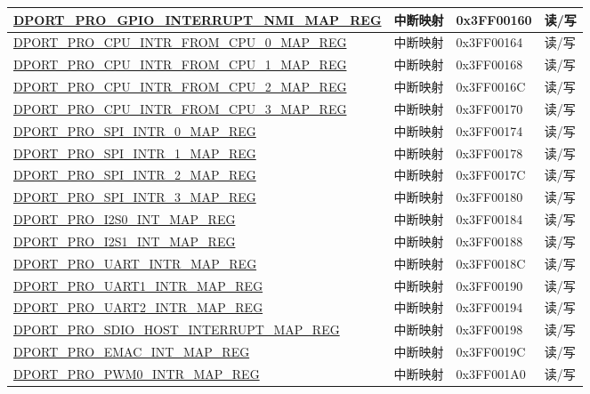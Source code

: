 \begin{longtable}{|L{8.2cm}|L{4.5cm}| l | l | }
\hyperref[regdesc:PROGPIOINTERRUPTNMIMAPREG]{DPORT\_PRO\_GPIO\_INTERRUPT\_NMI\_MAP\_REG} & 中断映射 & 0x3FF00160 & 读/写 \\ \hline
\hyperref[regdesc:PROCPUINTRFROMCPU0MAPREG]{DPORT\_PRO\_CPU\_INTR\_FROM\_CPU\_0\_MAP\_REG} & 中断映射 & 0x3FF00164 & 读/写 \\ \hline
\hyperref[regdesc:PROCPUINTRFROMCPU1MAPREG]{DPORT\_PRO\_CPU\_INTR\_FROM\_CPU\_1\_MAP\_REG} & 中断映射 & 0x3FF00168 & 读/写 \\ \hline
\hyperref[regdesc:PROCPUINTRFROMCPU2MAPREG]{DPORT\_PRO\_CPU\_INTR\_FROM\_CPU\_2\_MAP\_REG} & 中断映射 & 0x3FF0016C & 读/写 \\ \hline
\hyperref[regdesc:PROCPUINTRFROMCPU3MAPREG]{DPORT\_PRO\_CPU\_INTR\_FROM\_CPU\_3\_MAP\_REG} & 中断映射 & 0x3FF00170 & 读/写 \\ \hline
\hyperref[regdesc:PROSPIINTR0MAPREG]{DPORT\_PRO\_SPI\_INTR\_0\_MAP\_REG} & 中断映射 & 0x3FF00174 & 读/写 \\ \hline
\hyperref[regdesc:PROSPIINTR1MAPREG]{DPORT\_PRO\_SPI\_INTR\_1\_MAP\_REG} & 中断映射 & 0x3FF00178 & 读/写 \\ \hline
\hyperref[regdesc:PROSPIINTR2MAPREG]{DPORT\_PRO\_SPI\_INTR\_2\_MAP\_REG} & 中断映射 & 0x3FF0017C & 读/写 \\ \hline
\hyperref[regdesc:PROSPIINTR3MAPREG]{DPORT\_PRO\_SPI\_INTR\_3\_MAP\_REG} & 中断映射 & 0x3FF00180 & 读/写 \\ \hline
\hyperref[regdesc:PROI2S0INTMAPREG]{DPORT\_PRO\_I2S0\_INT\_MAP\_REG} & 中断映射 & 0x3FF00184 & 读/写 \\ \hline
\hyperref[regdesc:PROI2S1INTMAPREG]{DPORT\_PRO\_I2S1\_INT\_MAP\_REG} & 中断映射 & 0x3FF00188 & 读/写 \\ \hline
\hyperref[regdesc:PROUARTINTRMAPREG]{DPORT\_PRO\_UART\_INTR\_MAP\_REG} & 中断映射 & 0x3FF0018C & 读/写 \\ \hline
\hyperref[regdesc:PROUART1INTRMAPREG]{DPORT\_PRO\_UART1\_INTR\_MAP\_REG} & 中断映射 & 0x3FF00190 & 读/写 \\ \hline
\hyperref[regdesc:PROUART2INTRMAPREG]{DPORT\_PRO\_UART2\_INTR\_MAP\_REG} & 中断映射 & 0x3FF00194 & 读/写 \\ \hline
\hyperref[regdesc:PROSDIOHOSTINTERRUPTMAPREG]{DPORT\_PRO\_SDIO\_HOST\_INTERRUPT\_MAP\_REG} & 中断映射 & 0x3FF00198 & 读/写 \\ \hline
\hyperref[regdesc:PROEMACINTMAPREG]{DPORT\_PRO\_EMAC\_INT\_MAP\_REG} & 中断映射 & 0x3FF0019C & 读/写 \\ \hline
\hyperref[regdesc:PROPWM0INTRMAPREG]{DPORT\_PRO\_PWM0\_INTR\_MAP\_REG} & 中断映射 & 0x3FF001A0 & 读/写 \\ \hline

\end{longtable}
